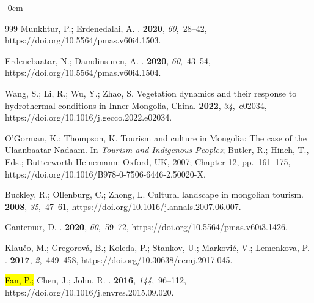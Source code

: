 \documentclass[geosciences,article,accept,pdftex,oneauthor]{Definitions/mdpi}
\begin{document}
\begin{adjustwidth}{-\extralength}{0cm}
\begin{thebibliography}{999}
Munkhtur, P.; Erdenedalai, A.
.
 {\bf 2020},
  {\em 60},~28--42, https://doi.org/10.5564/pmas.v60i4.1503.

Erdenebaatar, N.; Damdinsuren, A.
.
 {\bf 2020},
  {\em 60},~43--54, https://doi.org/10.5564/pmas.v60i4.1504.

Wang, S.; Li, R.; Wu, Y.; Zhao, S.
\newblock Vegetation dynamics and their response to hydrothermal conditions in
  Inner Mongolia, China.
 {\bf 2022}, {\em 34},~e02034, https://doi.org/10.1016/j.gecco.2022.e02034.

O'Gorman, K.; Thompson, K.
\newblock Tourism and culture in Mongolia: The case of the
  Ulaanbaatar Nadaam. In {\em Tourism and Indigenous Peoples}; Butler, R.;
  Hinch, T., Eds.; Butterworth-Heinemann: Oxford, UK, 2007; Chapter 12, pp.~161--175, https://doi.org/10.1016/B978-0-7506-6446-2.50020-X.

Buckley, R.; Ollenburg, C.; Zhong, L.
\newblock Cultural landscape in mongolian tourism.
 {\bf 2008}, {\em 35},~47--61, https://doi.org/10.1016/j.annals.2007.06.007.

Gantemur, D.
.
 {\bf 2020},
  {\em 60},~59--72, https://doi.org/10.5564/pmas.v60i3.1426.

Klaučo, M.; Gregorová, B.; Koleda, P.; Stankov, U.; Marković, V.; Lemenkova,
  P.
.
 {\bf 2017},
  {\em 2},~449--458, https://doi.org/10.30638/eemj.2017.045.

\hl{Fan, P.;} Chen, J.; John, R.
.
 {\bf 2016}, {\em 144},~96--112, https://doi.org/10.1016/j.envres.2015.09.020.%



\end{thebibliography}
\end{adjustwidth}
\end{document}
